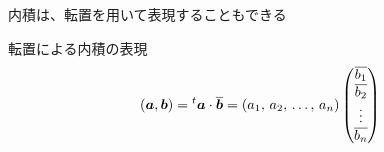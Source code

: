\documentclass[../../../topic_linear-algebra]{subfiles}
\begin{document}
内積は、転置を用いて表現することもできる

\begin{theorem}{転置による内積の表現}\label{thm:inner-product-as-transpose-product}
  \begin{equation*}
    (\vb*{a},\vb*{b}) = {}^t \vb*{a} \cdot \overline{\vb*{b}} = \left(a_1,\,a_2,\,\ldots,\,a_n\right) \begin{pmatrix}
      \overline{b_1} \\
      \overline{b_2} \\
      \vdots         \\
      \overline{b_n}
    \end{pmatrix}
  \end{equation*}
\end{theorem}
\end{document}
